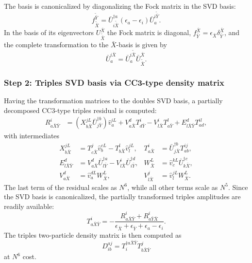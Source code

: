 \documentclass[a4paper,12pt,oneside]{book}
\begin{document}
The basis is canonicalized by diagonalizing the Fock matrix in the SVD basis:
\begin{equation}
f_{\tilde{\bar X}}^{\tilde{\bar Y}}=\bar{U}_{i\tilde{\bar X}}^{\dagger a}
(\epsilon_a - \epsilon_i)\bar{U}^{i\tilde{\bar Y}}_{a}.
\end{equation}
In the basis of its eigenvectors $U_{\tilde{\bar X}}^{\bar{X}}$ the Fock matrix is diagonal, 
$f^{{\bar X}}_{{\bar Y}}=\epsilon_{\bar X}\delta^{{\bar X}}_{{\bar Y}}$,
and the complete transformation to the ${\bar X}$-basis is given by
\begin{equation}
\bar{U}^{i{\bar X}}_{a}=\bar{U}^{i\tilde{\bar X}}_{a}\bar{U}_{\tilde{\bar X}}^{\bar{X}}.
\end{equation}

\subsubsection{Step 2: Triples SVD basis via CC3-type density matrix}

Having the transformation matrices to the doubles SVD basis, 
a partially decomposed CC3-type triples residual is computed:
\begin{equation}
\begin{aligned}
  R^i_{a\bar X\bar Y} &= \left( X_{b\bar X}^{jL} \bar{U}^{\dagger b}_{j \bar Y} \right) \hat{v}_a^{iL} 
  + V_{a \bar X}^d T^i_{d \bar Y} - V^i_{l \bar X} T^l_{a \bar Y}
  + E^d_{l \bar X \bar Y} T_{ad}^{il},
\end{aligned}
\end{equation}
with intermediates
\begin{equation}
\begin{aligned}
  X_{b\bar X}^{jL} &= T^j_{c\bar X} \hat v_{b}^{cL} - T^l_{b\bar X} \hat v_{l}^{jL}, &
  T_{a \bar X}^i &= \bar{U}^{\dagger b}_{j \bar X} T^{ij}_{ab}, \\
  E^d_{l \bar X \bar Y} &= V_{a \bar X}^d \bar{U}_{l \bar Y}^{\dagger a} - V_{l \bar X}^{i} \bar{U}_{i \bar Y}^{\dagger d}, &
  W_{\bar X}^L &= \hat{v}_c^{kL} \bar{U}^{\dagger c}_{k \bar X}, \\
  V^d_{a \bar X} &= \hat{v}_a^{dL} W^L_{\bar X}, &
  V^j_{l \bar X} &= \hat{v}^{jL}_l W^L_{\bar X}.
\end{aligned}
\end{equation}
The last term of the residual scales as $N^6$, while all other terms scale as $N^5$.
Since the SVD basis is canonicalized, the partially transformed triples amplitudes 
are readily available:
\begin{equation}
T^i_{a\bar X\bar Y} = - \frac{R^i_{a\bar X\bar Y} + R^i_{a\bar Y\bar X}}{\epsilon_{\bar X} + \epsilon_{\bar Y} + \epsilon_{a} - \epsilon_{i}}.
\end{equation}
The triples two-particle density matrix is then computed as
\begin{equation}
  D^{aj}_{ib} = T^{\dagger a \bar X\bar Y}_{i} T_{b \bar X\bar Y}^{j}
\end{equation}
at $N^6$ cost.
\end{document}
